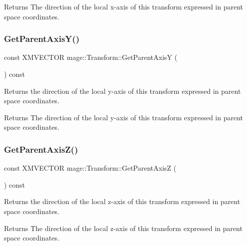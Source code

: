 \begin{DoxyReturn}{Returns}
The direction of the local x-\/axis of this transform expressed in parent space coordinates. 
\end{DoxyReturn}
\hypertarget{classmage_1_1_transform_a594483a22316fa35cac46e6e4d10ec3b}{}\label{classmage_1_1_transform_a594483a22316fa35cac46e6e4d10ec3b} 
\subsubsection{\texorpdfstring{Get\+Parent\+Axis\+Y()}{GetParentAxisY()}}
{\footnotesize\ttfamily const X\+M\+V\+E\+C\+T\+OR mage\+::\+Transform\+::\+Get\+Parent\+AxisY (\begin{DoxyParamCaption}{ }\end{DoxyParamCaption}) const\hspace{0.3cm}{\ttfamily [noexcept]}}

Returns the direction of the local y-\/axis of this transform expressed in parent space coordinates.

\begin{DoxyReturn}{Returns}
The direction of the local y-\/axis of this transform expressed in parent space coordinates. 
\end{DoxyReturn}
\hypertarget{classmage_1_1_transform_a1661099c0f983c32c1145f970d039d0b}{}\label{classmage_1_1_transform_a1661099c0f983c32c1145f970d039d0b} 
\subsubsection{\texorpdfstring{Get\+Parent\+Axis\+Z()}{GetParentAxisZ()}}
{\footnotesize\ttfamily const X\+M\+V\+E\+C\+T\+OR mage\+::\+Transform\+::\+Get\+Parent\+AxisZ (\begin{DoxyParamCaption}{ }\end{DoxyParamCaption}) const\hspace{0.3cm}{\ttfamily [noexcept]}}

Returns the direction of the local z-\/axis of this transform expressed in parent space coordinates.

\begin{DoxyReturn}{Returns}
The direction of the local z-\/axis of this transform expressed in parent space coordinates. 
\end{DoxyReturn}
\hypertarget{classmage_1_1_transform_a45b460585620b4b3e9ae20437ba1ef71}{}\label{classmage_1_1_transform_a45b460585620b4b3e9ae20437ba1ef71} 
